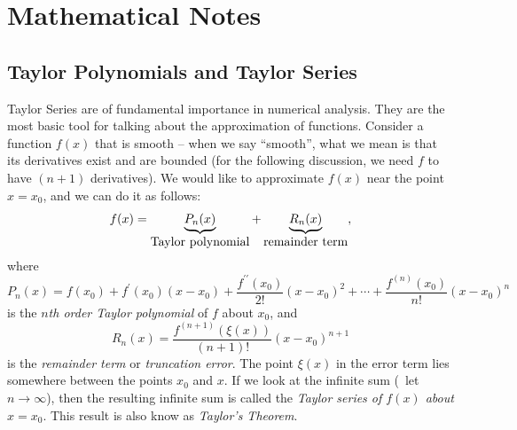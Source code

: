 % 
%
%
%
%
%
%
%

\section{Mathematical Notes}
\label{lab2:ap:mathnote}

\subsection{Taylor Polynomials and Taylor Series}
\label{lab2:ap:taylor-series}

Taylor Series are of fundamental importance in numerical analysis.
They are the most basic tool for talking about the approximation of
functions.
Consider a function $f(x)$ that is smooth -- when we say ``smooth'',
what we mean is that its derivatives exist and are bounded (for the
following discussion, we need $f$ to have $(n+1)$
derivatives).  
We would like to approximate $f(x)$ near the point $x=x_0$, and we
can do it as follows:
\[
  f(x) = \underbrace{P_n(x)}_{\mbox{\rm Taylor polynomial}} +
  \underbrace{R_n(x)}_{\mbox{\rm remainder term}},
\]
where 
\[
  P_n(x)=f(x_0)+ f^\prime(x_0)(x-x_0) +
  \frac{f^{\prime\prime}(x_0)}{2!}(x-x_0)^2 + \cdots + 
  \frac{f^{(n)}(x_0)}{n!}(x-x_0)^n 
\]
is the \emph{ $n$th order Taylor polynomial} of $f$ about $x_0$, and
\[
  R_n(x)=\frac{f^{(n+1)}(\xi(x))}{(n+1)!}(x-x_0)^{n+1}
\]
is the \emph{ remainder term} or \emph{ truncation error}.
The point $\xi(x)$ in the error term lies somewhere between the points
$x_0$ and $x$.
If we look at the infinite sum (\ie~let $n\rightarrow\infty$), then
the resulting infinite sum is called the \emph{ Taylor series of $f(x)$ about
  $x=x_0$}.  
This result is also know as \emph{ Taylor's Theorem}.

